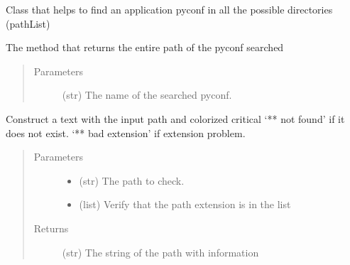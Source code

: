 \documentclass[a4paper,10pt,english]{sphinxmanual}
\begin{document}
\begin{fulllineitems}
\label{\detokenize{apidoc_src/src:src.configManager.ConfigOpener}}
Class that helps to find an application pyconf 
in all the possible directories (pathList)

\begin{fulllineitems}
\label{\detokenize{apidoc_src/src:src.configManager.ConfigOpener.get_path}}
The method that returns the entire path of the pyconf searched
\begin{quote}\begin{description}
\item[{Parameters}] \leavevmode
{} \textendash{} (str) The name of the searched pyconf.

\end{description}\end{quote}

\end{fulllineitems}


\end{fulllineitems}


\begin{fulllineitems}
\label{\detokenize{apidoc_src/src:src.configManager.check_path}}
Construct a text with the input path and colorized critical
‘** not found’ if it does not exist.
‘** bad extension’ if extension problem.
\begin{quote}\begin{description}
\item[{Parameters}] \leavevmode\begin{itemize}
\item {} 
 \textendash{} (str) The path to check.

\item {} 
 \textendash{} (list) Verify that the path extension is in the list

\end{itemize}

\item[{Returns}] \leavevmode
(str) The string of the path with information

\end{description}\end{quote}

\end{fulllineitems}
\end{document}
